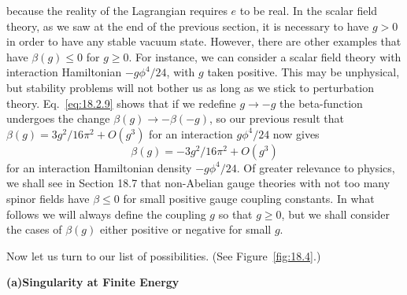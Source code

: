 

because the reality of the Lagrangian requires $e$ to be real. In the scalar
field theory, as we saw at the end of the previous section, it is necessary to
have $g>0$ in order to have any stable vacuum state. However, there are
other examples that have $\beta(g)\leq0$ for $g\geq0$. For instance, we can consider
a scalar field theory with interaction Hamiltonian $-g\phi^4/24$, with $g$ taken
positive. This may be unphysical, but stability problems will not bother
us as long as we stick to perturbation theory. Eq.\ \eqref{eq:18.2.9} shows that if we
redefine $g\to-g$ the beta-function undergoes the change $\beta(g)\to-\beta(-g)$,
so our previous result that $\beta(g)=3g^2/16\pi^2+O(g^3)$ for an interaction
$g\phi^4/24$ now gives
\begin{equation}
\beta(g)=-3g^2/16\pi^2+O(g^3)
\label{eq:18.3.4}
\end{equation}
for an interaction Hamiltonian density $-g\phi^4/24$. Of greater relevance to
physics, we shall see in Section 18.7 that non-Abelian gauge theories with
not too many spinor fields have $\beta\leq0$ for small positive gauge coupling
constants. In what follows we will always define the coupling $g$ so that
$g\geq0$, but we shall consider the cases of $\beta(g)$ either positive or negative
for small $g$.

Now let us turn to our list of possibilities. (See Figure~\ref{fig:18.4}.)

\medskip
\noindent\textbf{(a)\quad Singularity at Finite Energy}

